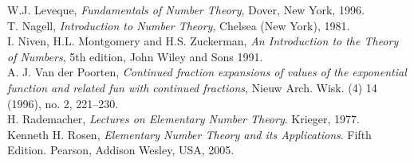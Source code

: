 \documentclass[12pt,letterpaper]{book}
\begin{document}
\begin{thebibliography}{99}
 W.J. Leveque, \textit{Fundamentals of Number
Theory}, Dover, New York, 1996.\\
 T. Nagell, \textit{Introduction to Number Theory},
Chelsea (New York), 1981.\\
 I. Niven, H.L. Montgomery and H.S. Zuckerman, \textit{An
Introduction to the Theory of Numbers}, 5th edition, John Wiley
and Sons 1991.\\
 A. J. Van der Poorten,
\textit{Continued fraction expansions of values of the exponential
function and related fun with continued fractions},
 Nieuw Arch. Wisk. (4) 14 (1996), no. 2, 221--230.\\
  H. Rademacher, \textit{Lectures on Elementary Number
 Theory}. Krieger, 1977.\\
 Kenneth H. Rosen, \textit{Elementary Number Theory and its
Applications}.  Fifth Edition. Pearson, Addison Wesley, USA,
2005.\\
\end{thebibliography}


\cleardoublepage
{}
{}
\printindex
\end{document}
